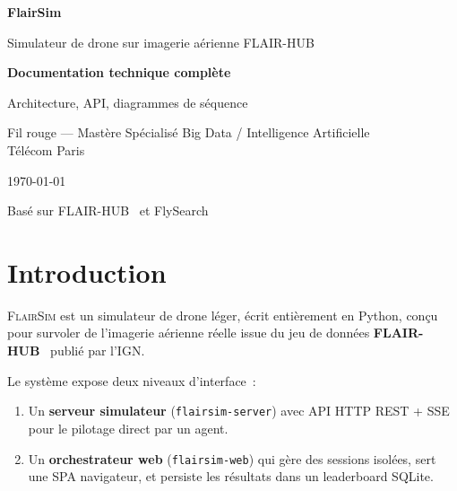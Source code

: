 \documentclass[a4paper, 11pt, french]{article}
\newcommand{\code}[1]{\texttt{#1}}
\newcommand{\flairsim}{\textsc{FlairSim}}
\begin{document}
\hypersetup{pageanchor=false}
\begin{titlepage}
\centering
\vspace*{2cm}
{\Huge\bfseries FlairSim\par}
\vspace{0.4cm}
{\Large Simulateur de drone sur imagerie aérienne FLAIR-HUB\par}
\vspace{1.5cm}
{\large\bfseries Documentation technique complète\par}
\vspace{0.3cm}
{\normalsize Architecture, API, diagrammes de séquence\par}
\vspace{2cm}
{\normalsize
Fil rouge --- Mastère Spécialisé Big Data / Intelligence Artificielle\\
Télécom Paris\par}
\vspace{1cm}
{\normalsize \today\par}
\vfill
{\footnotesize
Basé sur FLAIR-HUB~\cite{flairhub} et FlySearch~\cite{flysearch}\par}
\end{titlepage}

\setcounter{page}{1}
\hypersetup{pageanchor=true}

\tableofcontents
\newpage

\section{Introduction}

\flairsim{} est un simulateur de drone léger, écrit entièrement en
Python, conçu pour survoler de l'imagerie aérienne réelle issue du
jeu de données \textbf{FLAIR-HUB}~\cite{flairhub} publié par l'IGN.

Le système expose deux niveaux d'interface~:
\begin{enumerate}
  \item Un \textbf{serveur simulateur} (\code{flairsim-server}) avec
        API HTTP REST + SSE pour le pilotage direct par un agent.
  \item Un \textbf{orchestrateur web} (\code{flairsim-web}) qui gère
        des sessions isolées, sert une SPA navigateur, et persiste les
        résultats dans un leaderboard SQLite.
\end{enumerate}
\end{document}
